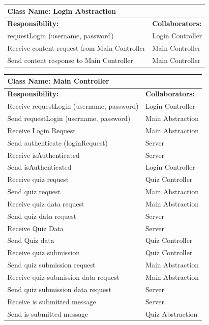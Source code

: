 \documentclass[]{article}
\begin{document}
	\begin{table}[H]
	\centering
		\begin{tabular}{|p{9cm}|p{3cm}|}
		\hline
		 \multicolumn{2}{|l|}{\textbf{Class Name: Login Abstraction}} \\
		\hline
		\textbf{Responsibility:} & \textbf{Collaborators:} \\
		\hline
	    requestLogin (username, password) & Login Controller\\
		\hline
		Receive content request from Main Controller & Main Controller\\
		\hline
		Send content response to Main Controller & Main Controller\\
		\hline
		\end{tabular}
	\end{table}
	
	\begin{table}[H]
	\centering
		\begin{tabular}{|p{9cm}|p{3cm}|}
		\hline
		 \multicolumn{2}{|l|}{\textbf{Class Name: Main Controller}} \\
		\hline
		\textbf{Responsibility:} & \textbf{Collaborators:} \\
		\hline
	    Receive requestLogin (username, password) & Login Controller\\
		\hline
	    Send requestLogin (username, password) & Main Abstraction\\
		\hline
		Receive Login Request & Main Abstraction\\
		\hline
		Send authenticate (loginRequest) & Server \\
		\hline
		Receive isAuthenticated & Server\\
		\hline 
		Send isAuthenticated & Login Controller\\
		\hline
		Receive quiz request & Quiz Controller\\
		\hline
		Send quiz request & Main Abstraction \\
		\hline
		Receive quiz data request & Main Abstraction\\
		\hline
		Send quiz data request & Server\\
		\hline
		Receive Quiz Data & Server\\
		\hline
		Send Quiz data & Quiz Controller\\
		\hline
		Receive quiz submission & Quiz Controller\\
		\hline
		Send quiz submission request & Main Abstraction\\
		\hline
		Receive quiz submission data request & Main Abstraction\\
		\hline
		Send quiz submission data request & Server\\
		\hline
		Receive is submitted message & Server\\
		\hline
		Send is submitted message & Quiz Abstraction\\
		\hline
		\end{tabular}
	\end{table}
	
\end{document}

